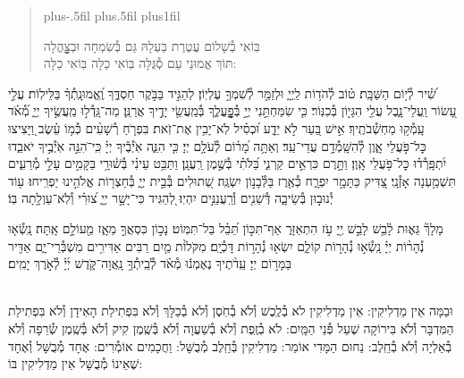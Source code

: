 \documentclass[twoside, openany, parskip=half, 11pt]{book}
\begin{document}
\begin{quote}
\leftskip=0pt plus-.5fil
\rightskip=0pt plus.5fil
\parfillskip=0pt plus1fil

בּֽוֹאִי בְ֯שָׁלוֹם עֲטֶרֶת בַּעְלָהּ \hfill
גַּם בְּ֯שִׂמְחָה וּבְצׇׇׇׇׇׇׇׇָהֳלָה \\
תּוֹךְ אֱמוּנֵי עַם סְ֯גֻּלָּה \hfill
בּֽוֹאִי כַלָּה בּֽוֹאִי כַלָּה:

\lechadodi

\end{quote}


שִׁ֝֗יר לְ֯י֥וֹם הַשַּׁבָּֽת׃
ט֗וֹב לְ֯הֹד֥וֹת לַֽיְיָ֑ וּלְזַמֵּ֖ר לְ֯שִׁמְךָ֣ עֶלְיֽוֹן׃
לְהַגִּ֣יד בַּבֹּ֣קֶר חַסְדֶּ֑ךָ וֶֽ֝אֱמוּנָֽתְ֯ךָ֗ בַּלֵּילֽוֹת׃
עֲלֵ֣י עָ֭שׂוֹר וַֽעֲלֵי־נָ֑בֶל עֲלֵ֖י הִגָּי֣וֹן בְּ֯כִנּֽוֹר׃
כִּ֤י שִׂמַּחְתַּ֣נִי יְיָ֣ בְּ֯פׇׇׇׇׇׇׇֽעֳלֶ֑ךָ בְּ֯מַֽעֲשֵׂ֖י יָדֶ֣יךָ אֲרַנֵּֽן׃
מַה־גָּֽדְ֯ל֣וּ מַֽעֲשֶׂ֣יךָ יְיָ֑ מְ֝֯אֹ֗ד עָֽמְ֯ק֥וּ מַחְשְׁ֯בֹתֶֽיךָ׃
אִ֣ישׁ בַּ֭עַר לֹ֣א יֵדָ֑ע וּ֝כְסִ֗יל לֹֽא־יָבִ֥ין אֶת־זֹֽאת׃
בִּפְרֹ֤חַ רְ֯שָׁעִ֨ים כְּ֯מ֥וֹ עֵ֗שֶׂב וַ֭יָּצִיצוּ כׇּל־פֹּ֣עֲלֵי אָ֑וֶן לְ֯הִשָּֽׁמְ֯דָ֥ם עֲדֵי־עַֽד׃
וְאַתָּ֥ה מָ֝ר֗וֹם לְ֯עֹלָ֥ם יְיָ׃
כִּ֤י הִנֵּ֢ה אֹֽיְ֯בֶ֡יךָ יְיָ֗ כִּֽי־ֹהִנֵּ֣ה אֹֽיְ֯בֶ֣יךָ יֹאבֵ֑דוּ יִ֝תְפָּֽרְ֯ד֗וּ כׇּל־פֹּ֥עֲלֵי אָֽוֶן׃
וַתָּ֣רֶם כִּרְאֵ֣ים קַרְנִ֑י בַּ֝לֹּתִ֗י בְּ֯שֶׁ֣מֶן רַֽעֲנָֽן׃
וַתַּבֵּ֥ט עֵינִ֗י בְּ֯שׁ֫וּרָ֥י בַּקָּמִ֣ים עָלַ֣י מְ֯רֵעִ֑ים תִּשְׁמַ֥עְנָה אָזְ֯נָֽי׃
 צַ֭דִּיק כַּתָּמָ֣ר יִפְרָ֑ח כְּ֯אֶ֖רֶז בַּלְּ֯בָנ֣וֹן יִשְׂגֶּֽה׃
שְׁ֭תוּלִים בְּ֯בֵ֣ית יְיָ֑ בְּ֯חַצְר֖וֹת אֱלֹהֵ֣ינוּ יַפְרִֽיחוּ׃
ע֖וֹד יְ֯נוּב֣וּן בְּ֯שֵׂיבָ֑ה דְּ֯שֵׁנִ֖ים וְ֯רַֽעֲנַנִּ֣ים יִהְיֽוּ׃
לְ֭הַגִּיד כִּי־יָשָׁ֣ר יְיָ֑ צ֝וּרִ֗י וְ֯לֹֽא־עַוְלָ֥תָה בּֽוֹ׃

מָלָךְ֘ גֵּא֢וּת לָ֫בֵ֥שׁ לָבֵ֣שׁ יְ֖יָ עֹ֣ז הִתְאַזָּר֑ אַף־תִּכּ֣וֹן תֵּ֝בֵ֗ל בַּל־תִּמּֽוֹט׃
נָכ֣וֹן כִּסְאֲךָ֣ מֵאָ֑ז מֵ֖עוֹלָ֣ם אָֽתָּה׃
נָֽשְׂ֯א֤וּ נְ֯הָר֨וֹת יְיָ֗ נָֽשְׂ֯א֣וּ נְ֯הָר֣וֹת קוֹלָ֑ם יִשְׂא֖וּ נְ֯הָר֣וֹת דָּכְ֯יָֽם׃
 מִקֹּלוֹ֨ת מַ֤יִם רַבִּים אַדִּירִ֥ים מִשְׁבְּ֯רֵי־יָ֑ם אַדִּ֖יר בַּמָּר֣וֹם יְיָ׃
עֵֽדֹ֨תֶיךָ נֶאֶמְנ֬וּ מְ֯אֹ֗ד לְ֯בֵֽיתְ֯ךָ֥ נָֽאֲוָה־קֹּ֑דֶשׁ יְ֜יָ֗ לְ֯אֹ֣רֶךְ יָמִֽים׃

\mournerskaddish


\\
וּבַמָּה אֵין מַדְלִיקִין: אֵין מַדְלִיקִין לֹא בְ֯לֶֽכֶשׁ וְ֯לֹא בְ֯חֹֽסֶן וְ֯לֹא בְ֯כַלָּךְ וְ֯לֹא בִּפְתִילַת הָאִידָן וְ֯לֹא בִּפְתִילַת הַמִּדְבָּר וְ֯לֹא בִּירוֹקָה שֶׁעַל פְּ֯נֵי הַמָּֽיִם: לֹא בְ֯זֶֽפֶת וְ֯לֹא בְ֯שַׁעֲוָה וְ֯לֹא בְּ֯שֶֽׁמֶן קִיק וְ֯לֹא בְּ֯שֶֽׁמֶן שְׂ֯רֵפָה וְ֯לֹא בְ֯אַלְיָה וְ֯לֹא בְ֯חֵֽלֶב: נַחוּם הַמָּדִי אוֹמֵר: מַדְלִיקִין בְּ֯חֵֽלֶב מְ֯בֻשָּׁל: וַחֲכָמִים אוֹמְ֯רִים: אֶחָד מְ֯בֻשָּׁל וְ֯אֶחָד שֶׁאֵינוֹ מְ֯בֻשָּׁל אֵין מַדְלִיקִין בּוֹ:
\end{document}
